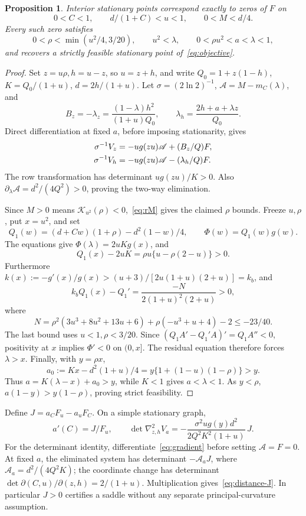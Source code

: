 \documentclass[12pt,letterpaper,onecolumn]{article}
\newtheorem{proposition}[theorem]{Proposition}
\theoremstyle{definition}
\begin{document}
\begin{proposition}\label{prop:stationarity}
Interior stationary points correspond exactly to zeros of \(F\) on
\begin{equation}\label{eq:physical}
0<C<1,\qquad d/(1+C)<u<1,\qquad 0<M<d/4.
\end{equation}
Every such zero satisfies
\[
0<\rho<\min(u^2/4,3/20),\qquad
u^2<\lambda,\qquad 0<\rho u^2<a<\lambda<1,
\]
and recovers a strictly feasible stationary point of~\eqref{eq:objective}.
\end{proposition}
\begin{proof}
Set \(z=u\rho,h=u-z\), so \(u=z+h\), and write
\(Q_0=1+z(1-h)\), \(K=Q_0/(1+u)\), \(d=2h/(1+u)\).
Let \(\sigma=(2\ln2)^{-1}\), \(\mathscr A=M-m_C(\lambda)\), and
\[
B_z=-\lambda_z=\frac{(1-\lambda)h^2}{(1+u)Q_0},
\qquad \lambda_h=\frac{2h+a+\lambda z}{Q_0}.
\]
Direct differentiation at fixed \(a\), before imposing stationarity, gives
\begin{align}
\sigma^{-1}V_z&=-ug(zu)\mathscr A+(B_z/Q)F,\notag\\
\sigma^{-1}V_h&=-ug(zu)\mathscr A-(\lambda_h/Q)F.\label{eq:gradient}
\end{align}
The row transformation has determinant \(ug(zu)/K>0\).
Also \(\partial_\lambda\mathscr A=d^2/(4Q^2)>0\), proving the two-way elimination.

Since \(M>0\) means \(\mathcal K_{u^2}(\rho)<0\),~\eqref{eq:rM} gives the claimed \(\rho\) bounds.
Freeze \(u,\rho\), put \(x=u^2\), and set
\[
Q_1(w)=(d+Cw)(1+\rho)-d^2(1-w)/4,\qquad \Phi(w)=Q_1(w)g(w).
\]
The equations give \(\Phi(\lambda)=2uKg(x)\), and
\[
Q_1(x)-2uK=\rho u\{u-\rho(2-u)\}>0.
\]
Furthermore \(k(x):=-g'(x)/g(x)>(u+3)/[2u(1+u)(2+u)]=k_b\), and
\[
k_bQ_1(x)-Q_1'=\frac{-N}{2(1+u)^2(2+u)}>0,
\]
where
\[
N=\rho^2(3u^3+8u^2+13u+6)+\rho(-u^3+u+4)-2\le-23/40.
\]
The last bound uses \(u<1,\rho<3/20\).
Since \((Q_1A'-Q_1'A)'=Q_1A''<0\), positivity at \(x\) implies \(\Phi'<0\) on \((0,x]\). The residual equation therefore forces \(\lambda>x\).
Finally, with \(y=\rho x\),
\[
a_0:=Kx-d^2(1+u)/4=y\{1+(1-u)(1-\rho)\}>y.
\]
Thus \(a=K(\lambda-x)+a_0>y\), while \(K<1\) gives \(a<\lambda<1\).
As \(y<\rho\), \(a(1-y)>y(1-\rho)\), proving strict feasibility.
\end{proof}

Define \(J=a_CF_u-a_uF_C\). On a simple stationary graph,
\begin{equation}\label{eq:distance-J}
a'(C)=J/F_u,\qquad
\det\nabla^2_{z,h}V_a
=-\frac{\sigma^2ug(y)d^2}{2Q^2K^2(1+u)}\,J.
\end{equation}
For the determinant identity, differentiate~\eqref{eq:gradient} before setting \(\mathscr A=F=0\).
At fixed \(a\), the eliminated system has determinant \(-\mathscr A_aJ\), where
\(\mathscr A_a=d^2/(4Q^2K)\); the coordinate change has determinant
\(\det\partial(C,u)/\partial(z,h)=2/(1+u)\).
Multiplication gives~\eqref{eq:distance-J}. In particular \(J>0\) certifies a saddle without any separate principal-curvature assumption.
\end{document}
